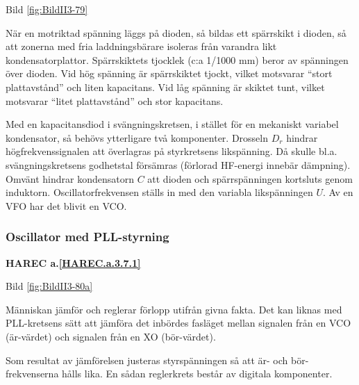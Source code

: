 Bild \ref{fig:BildII3-79}

När en motriktad spänning läggs på dioden, så bildas ett spärrskikt i
dioden, så att zonerna med fria laddningsbärare isoleras från varandra
likt kondensatorplattor. Spärrskiktets tjocklek (c:a 1/1000 mm) beror
av spänningen över dioden. Vid hög spänning är spärrskiktet tjockt,
vilket motsvarar ``stort plattavstånd'' och liten kapacitans. Vid låg
spänning är skiktet tunt, vilket motsvarar ``litet plattavstånd'' och
stor kapacitans.

Med en kapacitansdiod i svängningskretsen, i stället för en mekaniskt
variabel kondensator, så behövs ytterligare två komponenter. Drosseln
\(D_r\) hindrar högfrekvenssignalen att överlagras på styrkretsens
likspänning. Då skulle bl.a. svängningskretsens godhetstal försämras
(förlorad HF-energi innebär dämpning). Omvänt hindrar kondensatorn
\(C\) att dioden och spärrspänningen kortsluts genom
induktorn. Oscillatorfrekvensen ställs in med den variabla
likspänningen \(U\). Av en VFO har det blivit en VCO.

\subsubsection{Oscillator med PLL-styrning}
\textbf{HAREC a.\ref{HAREC.a.3.7.1}\label{myHAREC.a.3.7.1}}

Bild \ref{fig:BildII3-80a}

Människan jämför och reglerar förlopp utifrån givna fakta. Det kan
liknas med PLL-kretsens sätt att jämföra det inbördes fasläget mellan
signalen från en VCO (är-värdet) och signalen från en XO (bör-värdet).

Som resultat av jämförelsen justeras styrspänningen så att är- och
bör-frekvenserna hålls lika. En sådan reglerkrets består av digitala
komponenter.

